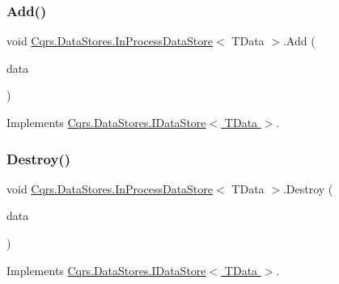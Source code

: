 \subsubsection{\texorpdfstring{Add()}{Add()}\hspace{0.1cm}{\footnotesize\ttfamily [2/2]}}
{\footnotesize\ttfamily void \hyperlink{classCqrs_1_1DataStores_1_1InProcessDataStore}{Cqrs.\+Data\+Stores.\+In\+Process\+Data\+Store}$<$ T\+Data $>$.Add (\begin{DoxyParamCaption}\item[{I\+Enumerable$<$ T\+Data $>$}]{data }\end{DoxyParamCaption})}



Implements \hyperlink{interfaceCqrs_1_1DataStores_1_1IDataStore_a906f3f2f80db7a549a4170eca4653e26_a906f3f2f80db7a549a4170eca4653e26}{Cqrs.\+Data\+Stores.\+I\+Data\+Store$<$ T\+Data $>$}.

\mbox{\label{classCqrs_1_1DataStores_1_1InProcessDataStore_a1fc7a3935f52087f3703b652e77f0b75_a1fc7a3935f52087f3703b652e77f0b75}} 
\subsubsection{\texorpdfstring{Destroy()}{Destroy()}}
{\footnotesize\ttfamily void \hyperlink{classCqrs_1_1DataStores_1_1InProcessDataStore}{Cqrs.\+Data\+Stores.\+In\+Process\+Data\+Store}$<$ T\+Data $>$.Destroy (\begin{DoxyParamCaption}\item[{T\+Data}]{data }\end{DoxyParamCaption})}



Implements \hyperlink{interfaceCqrs_1_1DataStores_1_1IDataStore_aa7ade96f2f3151d5353cf7bdbb2baec5_aa7ade96f2f3151d5353cf7bdbb2baec5}{Cqrs.\+Data\+Stores.\+I\+Data\+Store$<$ T\+Data $>$}.

\mbox{\label{classCqrs_1_1DataStores_1_1InProcessDataStore_a220126a1dd0e318197b9c994c313d5fd_a220126a1dd0e318197b9c994c313d5fd}} 
